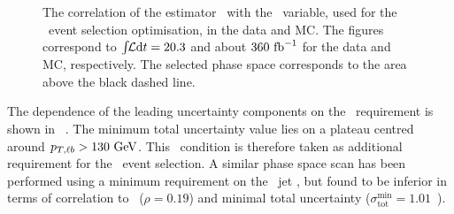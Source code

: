 \begin{figure}[tbp!]
\centering
{}
\caption[Correlation of \mlbr\ and \ptlb]{
%
The correlation of the estimator \mlbr\ with the \ptlb\ variable, used for the \cutbased\ event selection optimisation, in the data and \gls{MC}. 
%
The figures correspond to $\int\!\!{\mathcal L}\mathrm{d}t=20.3$ and about $360~\mathrm{fb}^{-1}$ for the data and \gls{MC}, respectively.
%
The selected phase space corresponds to the area above the black dashed line.
%
\label{fig:mlb_ptlb_corr}
}
\end{figure}
%
The dependence of the leading uncertainty components on the \ptlb\ requirement is shown in \fig~.
%
The minimum total uncertainty value lies on a plateau centred around $p_{T,\ell b}>130~\mathrm{GeV}$. 
%
This \ptlb\ condition is therefore taken as additional requirement for the \cutbased\ event selection. 
%
A similar phase space scan has been performed using a minimum requirement on the \btagged\ jet \pt,  but found to be inferior in terms of correlation to \mlb\ ($\rho=0.19$) and minimal total uncertainty ($\sigma_\mathrm{tot}^\mathrm{min}=1.01$~\GeV). 
